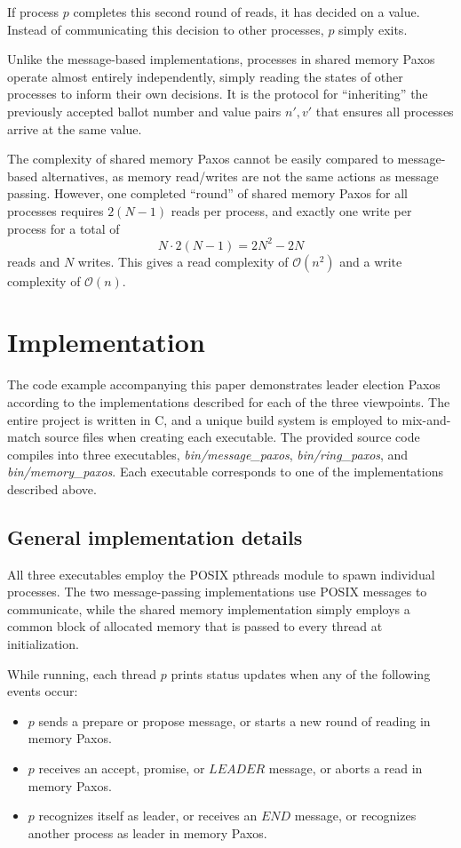 \documentclass[12pt]{article}
\renewcommand{\O}{\mathcal{O}}
\begin{document}
If process $p$ completes this second round of reads, it has decided on a value. Instead
of communicating this decision to other processes, $p$ simply exits.

Unlike the message-based implementations, processes in shared memory Paxos operate almost
entirely independently, simply reading the states of other processes to inform their own decisions.
It is the protocol for ``inheriting'' the previously accepted ballot number and value pairs $n', v'$
that ensures all processes arrive at the same value.

The complexity of shared memory Paxos cannot be easily compared to message-based alternatives, as
memory read/writes are not the same actions as message passing. However, one completed ``round'' of shared
memory Paxos for all processes requires $2(N-1)$ reads per process, and exactly one write per process
for a total of
$$N \cdot 2(N-1) = 2N^2 - 2N$$
reads and $N$ writes. This gives a read complexity of $\O(n^2)$ and a write
complexity of $\O(n)$.

\section{Implementation}
The code example accompanying this paper demonstrates leader election Paxos according to
the implementations described for each of the three viewpoints. The entire project
is written in C, and a unique build system is employed to mix-and-match source
files when creating each executable. The provided source code compiles into
three executables, \textit{bin/message\_paxos}, \textit{bin/ring\_paxos}, and
\textit{bin/memory\_paxos}. Each executable corresponds to one
of the implementations described above.

\subsection{General implementation details}
All three executables employ the POSIX pthreads module to spawn individual processes.
The two message-passing implementations use POSIX messages to communicate, while
the shared memory implementation simply employs a common block of allocated
memory that is passed to every thread at initialization.

While running, each thread $p$ prints status updates when any of the following events occur:
\begin{itemize}
\item $p$ sends a prepare or propose message, or starts a new round of
  reading in memory Paxos.
\item $p$ receives an accept, promise, or $LEADER$ message, or aborts a read
  in memory Paxos.
\item $p$ recognizes itself as leader, or receives an $END$ message, or recognizes
  another process as leader in memory Paxos.
\end{itemize}
\end{document}

